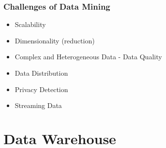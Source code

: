 \documentclass[10pt,a4paper]{article}
\begin{document}
\subsubsection{Challenges of Data Mining}
\begin{itemize}
	\item Scalability
	\item Dimensionality (reduction)
	\item Complex and Heterogeneous Data - Data Quality
	\item Data Distribution
	\item Privacy Detection
	\item Streaming Data
\end{itemize}

\section{Data Warehouse}
\end{document}
